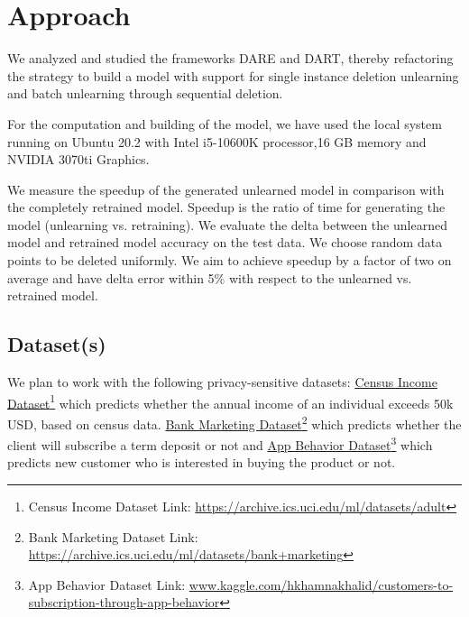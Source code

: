 \documentclass[11pt,letterpaper]{article}
\begin{document}


\section{Approach}
We analyzed and studied the frameworks DARE and DART, thereby refactoring the strategy to build a model with support for single instance deletion unlearning and batch unlearning through sequential deletion.

For the computation and building of the model, we have used the local system running on Ubuntu 20.2 with Intel i5-10600K processor,16 GB memory and NVIDIA 3070ti Graphics.

We measure the speedup of the generated unlearned model in comparison with the completely retrained model. Speedup is the ratio of time for generating the model (unlearning vs. retraining). We evaluate the delta between the unlearned model and retrained model accuracy on the test data. We choose random data points to be deleted uniformly. We aim to achieve speedup by a factor of two on average and have delta error within 5\% with respect to the unlearned vs. retrained model.

\subsection{Dataset(s)}
We plan to work with the following privacy-sensitive datasets:
\href{https://archive.ics.uci.edu/ml/datasets/adult}{Census Income Dataset}\footnote{Census Income Dataset Link: \url{https://archive.ics.uci.edu/ml/datasets/adult}} which predicts whether the annual income of an individual exceeds 50k USD, based on census data. \href{https://archive.ics.uci.edu/ml/datasets/bank+marketing}{Bank Marketing Dataset}\footnote{Bank Marketing Dataset Link: \url{https://archive.ics.uci.edu/ml/datasets/bank+marketing}} which predicts whether the client will subscribe a term deposit or not and \href{https://www.kaggle.com/hkhamnakhalid/customers-to-subscription-through-app-behavior}{App Behavior Dataset}\footnote{App Behavior Dataset Link: \url{www.kaggle.com/hkhamnakhalid/customers-to-subscription-through-app-behavior}} which predicts new customer who is interested in buying the product or not.
\end{document}
